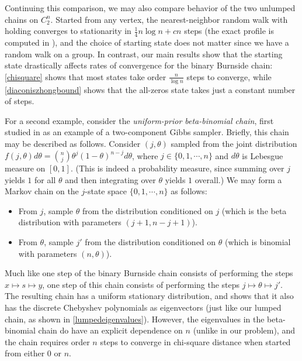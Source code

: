 \documentclass[11pt]{article}
\newcounter{r}
\newcounter{s}
\numberwithin{equation}{section}
\begin{document}
Continuing this comparison, we may also compare behavior of the two unlumped chains on $C_2^n$. Started from any vertex, the nearest-neighbor random walk with holding converges to stationarity in $\frac{1}{4}n \log n + cn$ steps (the exact profile is computed in \cite{nearestneighbor}), and the choice of starting state does not matter since we have a random walk on a group. In contrast, our main results show that the starting state drastically affects rates of convergence for the binary Burnside chain: \cref{chisquare} shows that most states take order $\frac{n}{\log n}$ steps to converge, while \cref{diaconiszhongbound} shows that the all-zeros state takes just a constant number of steps.

\medskip

For a second example, consider the \textit{uniform-prior beta-binomial chain}, first studied in \cite{twogibbs} as an example of a two-component Gibbs sampler. Briefly, this chain may be described as follows. Consider $(j, \theta)$ sampled from the joint distribution $f(j, \theta) d\theta = \binom{n}{j} \theta^j (1 - \theta)^{n-j} d\theta$, where $j \in \{0, 1, \cdots, n\}$ and $d\theta$ is Lebesgue measure on $[0, 1]$. (This is indeed a probability measure, since summing over $j$ yields $1$ for all $\theta$ and then integrating over $\theta$ yields $1$ overall.) We may form a Markov chain on the $j$-state space $\{0, 1, \cdots, n\}$ as follows:
\begin{itemize}
    \item From $j$, sample $\theta$ from the distribution conditioned on $j$ (which is the beta distribution with parameters $(j+1, n-j+1)$).
    \item From $\theta$, sample $j'$ from the distribution conditioned on $\theta$ (which is binomial with parameters $(n, \theta)$).
\end{itemize}
Much like one step of the binary Burnside chain consists of performing the steps $x \mapsto s \mapsto y$, one step of this chain consists of performing the steps $j \mapsto \theta \mapsto j'$. The resulting chain has a uniform stationary distribution, and \cite[Proposition 1.1]{twogibbs} shows that it also has the discrete Chebyshev polynomials as eigenvectors (just like our lumped chain, as shown in \cref{lumpedeigenvalues}). However, the eigenvalues in the beta-binomial chain do have an explicit dependence on $n$ (unlike in our problem), and the chain requires order $n$ steps to converge in chi-square distance when started from either $0$ or $n$.
\end{document}
